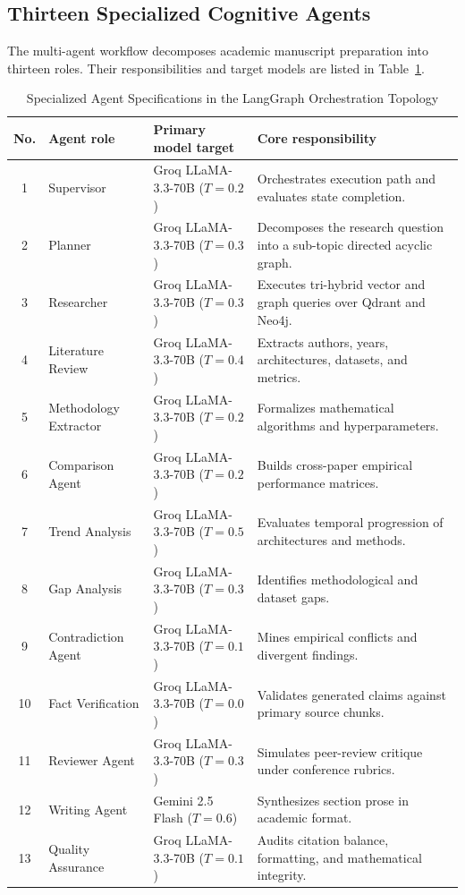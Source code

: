 \documentclass[conference]{IEEEtran}
\begin{document}
\subsection{Thirteen Specialized Cognitive Agents}
The multi-agent workflow decomposes academic manuscript preparation into thirteen roles. Their responsibilities and target models are listed in Table~\ref{tab:agents}.
\begin{table}[!t]
\caption{Specialized Agent Specifications in the LangGraph Orchestration Topology}
\label{tab:agents}
\centering
\small
\begin{tabularx}{\textwidth}{@{}c l l X@{}}
\toprule
\textbf{No.} & \textbf{Agent role} & \textbf{Primary model target} & \textbf{Core responsibility}\\
\midrule
1 & Supervisor & Groq LLaMA-3.3-70B ($T=0.2$) & Orchestrates execution path and evaluates state completion.\\
2 & Planner & Groq LLaMA-3.3-70B ($T=0.3$) & Decomposes the research question into a sub-topic directed acyclic graph.\\
3 & Researcher & Groq LLaMA-3.3-70B ($T=0.3$) & Executes tri-hybrid vector and graph queries over Qdrant and Neo4j.\\
4 & Literature Review & Groq LLaMA-3.3-70B ($T=0.4$) & Extracts authors, years, architectures, datasets, and metrics.\\
5 & Methodology Extractor & Groq LLaMA-3.3-70B ($T=0.2$) & Formalizes mathematical algorithms and hyperparameters.\\
6 & Comparison Agent & Groq LLaMA-3.3-70B ($T=0.2$) & Builds cross-paper empirical performance matrices.\\
7 & Trend Analysis & Groq LLaMA-3.3-70B ($T=0.5$) & Evaluates temporal progression of architectures and methods.\\
8 & Gap Analysis & Groq LLaMA-3.3-70B ($T=0.3$) & Identifies methodological and dataset gaps.\\
9 & Contradiction Agent & Groq LLaMA-3.3-70B ($T=0.1$) & Mines empirical conflicts and divergent findings.\\
10 & Fact Verification & Groq LLaMA-3.3-70B ($T=0.0$) & Validates generated claims against primary source chunks.\\
11 & Reviewer Agent & Groq LLaMA-3.3-70B ($T=0.3$) & Simulates peer-review critique under conference rubrics.\\
12 & Writing Agent & Gemini 2.5 Flash ($T=0.6$) & Synthesizes section prose in academic format.\\
13 & Quality Assurance & Groq LLaMA-3.3-70B ($T=0.1$) & Audits citation balance, formatting, and mathematical integrity.\\
\bottomrule
\end{tabularx}
\end{table}
\end{document}
